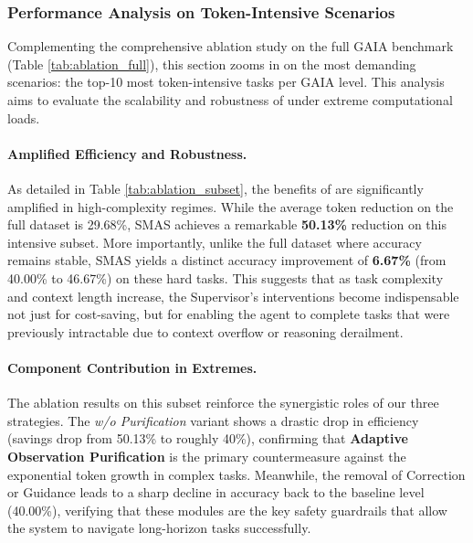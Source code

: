 \subsubsection{Performance Analysis on Token-Intensive Scenarios}
\label{ablation_study_subset}

Complementing the comprehensive ablation study on the full GAIA benchmark (Table \ref{tab:ablation_full}), this section zooms in on the most demanding scenarios: the top-10 most token-intensive tasks per GAIA level. This analysis aims to evaluate the scalability and robustness of \method{} under extreme computational loads.

\paragraph{Amplified Efficiency and Robustness.}
As detailed in Table \ref{tab:ablation_subset}, the benefits of \method are significantly amplified in high-complexity regimes. While the average token reduction on the full dataset is 29.68\%, SMAS achieves a remarkable \textbf{50.13\%} reduction on this intensive subset. More importantly, unlike the full dataset where accuracy remains stable, SMAS yields a distinct accuracy improvement of \textbf{6.67\%} (from 40.00\% to 46.67\%) on these hard tasks. This suggests that as task complexity and context length increase, the Supervisor's interventions become indispensable not just for cost-saving, but for enabling the agent to complete tasks that were previously intractable due to context overflow or reasoning derailment.

\paragraph{Component Contribution in Extremes.}
The ablation results on this subset reinforce the synergistic roles of our three strategies. The \textit{w/o Purification} variant shows a drastic drop in efficiency (savings drop from 50.13\% to roughly 40\%), confirming that \textbf{Adaptive Observation Purification} is the primary countermeasure against the exponential token growth in complex tasks. Meanwhile, the removal of Correction or Guidance leads to a sharp decline in accuracy back to the baseline level (40.00\%), verifying that these modules are the key safety guardrails that allow the system to navigate long-horizon tasks successfully.



